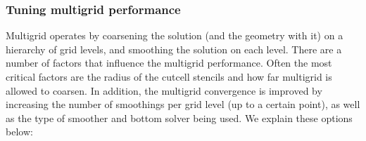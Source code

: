 \documentclass[letterpaper,10pt,english]{sphinxmanual}
\begin{document}
\subsubsection{Tuning multigrid performance}
\label{\detokenize{Solvers/Electrostatics:tuning-multigrid-performance}}
\sphinxAtStartPar
Multigrid operates by coarsening the solution (and the geometry with it) on a hierarchy of grid levels, and smoothing the solution on each level.
There are a number of factors that influence the multigrid performance.
Often the most critical factors are the radius of the cut\sphinxhyphen{}cell stencils and how far multigrid is allowed to coarsen.
In addition, the multigrid convergence is improved by increasing the number of smoothings per grid level (up to a certain point), as well as the type of smoother and bottom solver being used.
We explain these options below:
\end{document}
